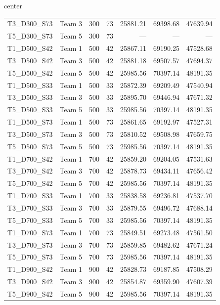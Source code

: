 {\begin{adjustbox}{center}
\begin{tabular}{llccrrr}
T3\_D300\_S73 & Team 3 & 300 & 73 & 25881.21 & 69398.68 & 47639.94 \\
T5\_D300\_S73 & Team 5 & 300 & 73 & --- & --- & --- \\
			\midrule
T1\_D500\_S42 & Team 1 & 500 & 42 & 25867.11 & 69190.25 & 47528.68 \\
T3\_D500\_S42 & Team 3 & 500 & 42 & 25881.18 & 69507.57 & 47694.37 \\
T5\_D500\_S42 & Team 5 & 500 & 42 & 25985.56 & 70397.14 & 48191.35 \\
			\midrule
T1\_D500\_S33 & Team 1 & 500 & 33 & 25872.39 & 69209.49 & 47540.94 \\
T3\_D500\_S33 & Team 3 & 500 & 33 & 25895.70 & 69446.94 & 47671.32 \\
T5\_D500\_S33 & Team 5 & 500 & 33 & 25985.56 & 70397.14 & 48191.35 \\
			\midrule
T1\_D500\_S73 & Team 1 & 500 & 73 & 25861.65 & 69192.97 & 47527.31 \\
T3\_D500\_S73 & Team 3 & 500 & 73 & 25810.52 & 69508.98 & 47659.75 \\
T5\_D500\_S73 & Team 5 & 500 & 73 & 25985.56 & 70397.14 & 48191.35 \\
			\midrule
T1\_D700\_S42 & Team 1 & 700 & 42 & 25859.20 & 69204.05 & 47531.63 \\
T3\_D700\_S42 & Team 3 & 700 & 42 & 25878.73 & 69434.11 & 47656.42 \\
T5\_D700\_S42 & Team 5 & 700 & 42 & 25985.56 & 70397.14 & 48191.35 \\
			\midrule
T1\_D700\_S33 & Team 1 & 700 & 33 & 25838.58 & 69236.81 & 47537.70 \\
T3\_D700\_S33 & Team 3 & 700 & 33 & 25879.55 & 69496.72 & 47688.14 \\
T5\_D700\_S33 & Team 5 & 700 & 33 & 25985.56 & 70397.14 & 48191.35 \\
			\midrule
T1\_D700\_S73 & Team 1 & 700 & 73 & 25849.51 & 69273.48 & 47561.50 \\
T3\_D700\_S73 & Team 3 & 700 & 73 & 25859.85 & 69482.62 & 47671.24 \\
T5\_D700\_S73 & Team 5 & 700 & 73 & 25985.56 & 70397.14 & 48191.35 \\
			\midrule
T1\_D900\_S42 & Team 1 & 900 & 42 & 25828.73 & 69187.85 & 47508.29 \\
T3\_D900\_S42 & Team 3 & 900 & 42 & 25854.87 & 69359.90 & 47607.39 \\
T5\_D900\_S42 & Team 5 & 900 & 42 & 25985.56 & 70397.14 & 48191.35 \\
			\midrule

\end{tabular}
\end{adjustbox}}
